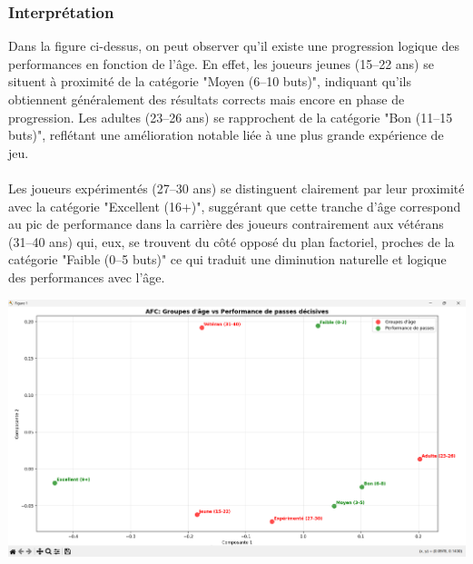 \documentclass[12pt]{scrartcl}
\begin{document}
            \subsubsection{Interprétation}
                Dans la figure ci-dessus, on peut observer qu'il existe une progression logique des performances en fonction de l’âge. En effet, les joueurs jeunes (15–22 ans) se situent à proximité de la catégorie "Moyen (6–10 buts)", indiquant qu’ils obtiennent généralement des résultats corrects mais encore en phase de progression. Les adultes (23–26 ans) se rapprochent de la catégorie "Bon (11–15 buts)", reflétant une amélioration notable liée à une plus grande expérience de jeu.\\\\
                Les joueurs expérimentés (27–30 ans) se distinguent clairement par leur proximité avec la catégorie "Excellent (16+)", suggérant que cette tranche d’âge correspond au pic de performance dans la carrière des joueurs contrairement aux vétérans (31–40 ans) qui, eux, se trouvent du côté opposé du plan factoriel, proches de la catégorie "Faible (0–5 buts)" ce qui traduit une diminution naturelle et logique des performances avec l’âge.\\

                \begin{center}
                    \includegraphics[width=1\textwidth]{images/graphique_AFC_passes.png}
                \end{center}
\end{document}
